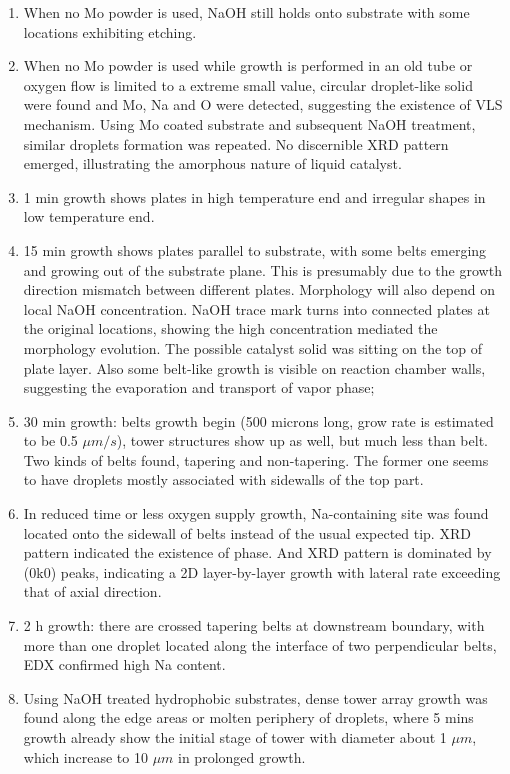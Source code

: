 \begin{enumerate}
\item When no Mo powder is used, NaOH still holds onto substrate with some locations exhibiting etching.
\item When no Mo powder is used while growth is performed in an old tube or oxygen flow is limited to a extreme small value, circular droplet-like solid were found and Mo, Na and O were detected, suggesting the existence of VLS mechanism. Using Mo coated substrate and subsequent NaOH treatment, similar droplets formation was repeated. No discernible XRD pattern emerged, illustrating the amorphous nature of liquid catalyst.
\item 1 min growth shows plates in high temperature end and irregular shapes in low temperature end.
\item 15 min growth shows  plates parallel to substrate, with some belts emerging and growing out of the substrate plane. This is presumably due to the growth direction mismatch between different plates. Morphology will also depend on local NaOH concentration. NaOH trace mark turns into connected plates at the original locations, showing the high concentration mediated the morphology evolution. The possible catalyst solid was sitting on the top of plate layer. Also some belt-like growth is visible on reaction chamber walls, suggesting the evaporation and transport of  vapor phase;
\item 30 min growth: belts growth begin (500 microns long, grow rate is estimated to be 0.5 $\mu m/s$), tower structures show up as well, but much less than belt. Two kinds of belts found, tapering and non-tapering. The former one seems to have droplets mostly associated with sidewalls of the top part.
\item In reduced time or less oxygen supply growth, Na-containing site was found located onto the sidewall of belts instead of the usual expected tip. XRD pattern indicated the existence of  phase. And  XRD pattern is dominated by (0k0) peaks, indicating a 2D layer-by-layer growth with lateral rate exceeding that of axial direction.
\item 2 h growth: there are crossed tapering belts at downstream boundary, with more than one droplet located along the interface of two perpendicular belts, EDX confirmed high Na content.
\item Using NaOH treated hydrophobic substrates, dense tower array growth was found along the edge areas or molten periphery of droplets, where 5 mins growth already show the initial stage of tower with diameter about 1 $\mu m$, which increase to 10 $\mu m$ in prolonged growth.
\end{enumerate}


